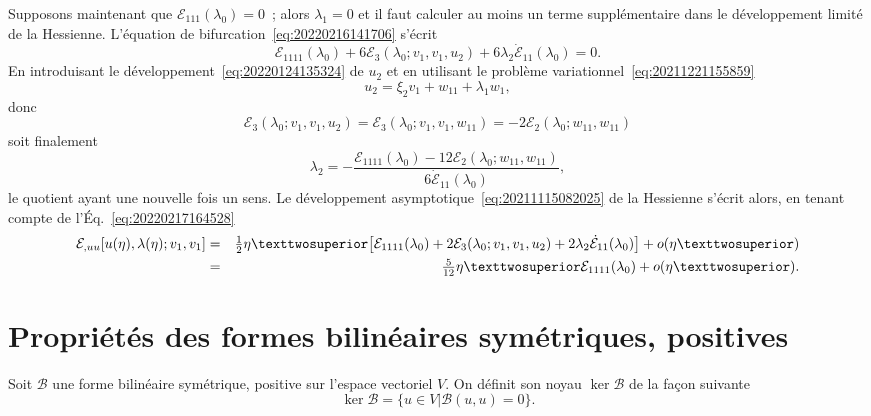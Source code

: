 \documentclass[12pt, final]{amsart}
\begin{document}
Supposons maintenant que \(\mathcal E_{111}(\lambda _0)=0\)~; alors \(\lambda _1=0\) et il faut calculer au
moins un terme supplémentaire dans le développement limité de la
Hessienne. L'équation de bifurcation~\eqref{eq:20220216141706} s'écrit
\begin{equation}
  \label{eq:20220217164528}
  \mathcal E_{1111}(\lambda _0)+6\mathcal E_3(\lambda _0; v_1, v_1, u_2)+6\lambda _2\dot{\mathcal E}_{11}(\lambda _0)=0.
\end{equation}
En introduisant le développement~\eqref{eq:20220124135324} de \(u_2\) et en
utilisant le problème variationnel~\eqref{eq:20211221155859}
\begin{equation}
  u_2=\xi _2v_1+w_{11}+\lambda _1w_1,
\end{equation}
donc
\begin{equation}
  \mathcal E_3(\lambda _0;v_1, v_1, u_2)=\mathcal E_3(\lambda _0;v_1, v_1, w_{11})=-2\mathcal E_2(\lambda _0;w_{11}, w_{11})
\end{equation}
soit finalement
\begin{equation*}
  \lambda _2=-\frac{\mathcal E_{1111}(\lambda _0)-12\mathcal E_2(\lambda _0;w_{11}, w_{11})}{6\dot{\mathcal E}_{11}(\lambda _0)},
\end{equation*}
le quotient ayant une nouvelle fois un sens. Le développement
asymptotique~\eqref{eq:20211115082025} de la Hessienne s'écrit alors, en tenant
compte de l'Éq.~\eqref{eq:20220217164528}
\begin{eqnarray}
  \notag
  \mathcal E_{,uu}[u(\eta ), \lambda (\eta ); v_1, v_1]
  &=&\tfrac12\eta ²\bigl[\mathcal E_{1111}(\lambda _0)+2\mathcal E_3(\lambda _0; v_1, v_1, u_2)+2\lambda _2\dot{\mathcal E}_{11}(\lambda _0)\bigr]+o(\eta ²)\\
  &=&\tfrac5{12}\eta ²\mathcal E_{1111}(\lambda _0)+o(\eta ²).
\end{eqnarray}

\appendix

\section{Propriétés des formes bilinéaires symétriques, positives}

Soit \(\mathcal B\) une forme bilinéaire symétrique, positive sur l'espace vectoriel
\(V\). On définit son noyau \(\ker\mathcal B\) de la façon suivante
\begin{equation}
  \ker\mathcal B=\{u\in V|\mathcal B(u, u)=0\}.
\end{equation}
\end{document}
